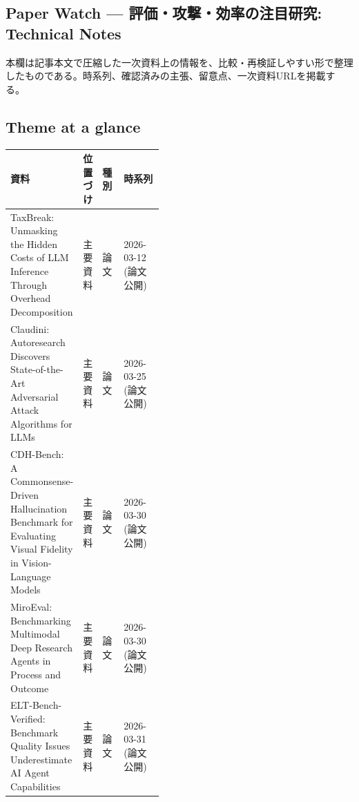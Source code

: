 \subsection*{Paper Watch — 評価・攻撃・効率の注目研究: Technical Notes}
本欄は記事本文で圧縮した一次資料上の情報を、比較・再検証しやすい形で整理したものである。時系列、確認済みの主張、留意点、一次資料URLを掲載する。
\medskip
\subsection*{Theme at a glance}
\begin{center}
\footnotesize
\begin{tabularx}{\linewidth}{@{}p{0.20\linewidth}p{0.10\linewidth}p{0.14\linewidth}X@{}}
\toprule
資料 & 位置づけ & 種別 & 時系列 \\
\midrule
TaxBreak: Unmasking the Hidden Costs of LLM Inference Through Overhead Decomposition & 主要資料 & 論文 & 2026-03-12 (論文公開) \\
Claudini: Autoresearch Discovers State-of-the-Art Adversarial Attack Algorithms for LLMs & 主要資料 & 論文 & 2026-03-25 (論文公開) \\
CDH-Bench: A Commonsense-Driven Hallucination Benchmark for Evaluating Visual Fidelity in Vision-Language Models & 主要資料 & 論文 & 2026-03-30 (論文公開) \\
MiroEval: Benchmarking Multimodal Deep Research Agents in Process and Outcome & 主要資料 & 論文 & 2026-03-30 (論文公開) \\
ELT-Bench-Verified: Benchmark Quality Issues Underestimate AI Agent Capabilities & 主要資料 & 論文 & 2026-03-31 (論文公開) \\
\bottomrule
\end{tabularx}
\end{center}
\normalsize

